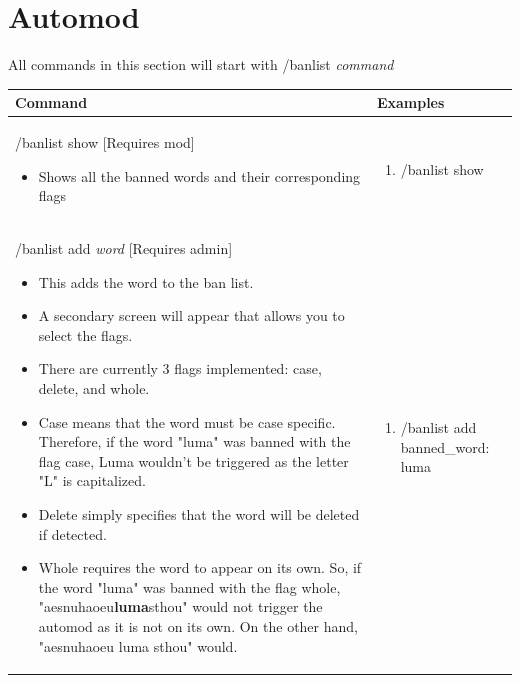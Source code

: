 \documentclass{scrartcl}
\begin{document}
\section{Automod}
All commands in this section will start with /banlist \textit{command}

\begin{tabularx}{\textwidth}{|>{\raggedright\arraybackslash}X|>{\raggedright\arraybackslash}X|}
\hline
Command & Examples\\
\hline
/banlist show [Requires mod]
\begin{itemize}
    \item Shows all the banned words and their corresponding flags
\end{itemize}
&
\begin{enumerate}
    \item /banlist show 
\end{enumerate}\\
\hline
/banlist add \textit{word} [Requires admin]
\begin{itemize}
    \item This adds the word to the ban list.
    \item A secondary screen will appear that allows you to select the flags.
    \item There are currently 3 flags implemented: case, delete, and whole.
    \item Case means that the word must be case specific. Therefore, if the word "luma" was banned with the flag case, Luma wouldn't be triggered as the letter "L" is capitalized.
    \item Delete simply specifies that the word will be deleted if detected.
    \item Whole requires the word to appear on its own. So, if the word "luma" was banned with the flag whole, "aesnuhaoeu\textbf{luma}sthou" would not trigger the automod as it is not on its own. On the other hand, "aesnuhaoeu luma sthou" would.
\end{itemize}
&
\begin{enumerate}
    \item /banlist add banned\_word: \color{gray} luma \color{black}
    

\end{enumerate}
\end{tabularx}
\end{document}
